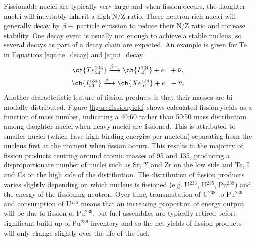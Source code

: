 Fissionable nuclei are typically very large and when fission occurs, the daughter nuclei will inevitably inherit a high N/Z ratio. These neutron-rich nuclei will generally decay by $\beta-$ particle emission to reduce their N/Z ratio and increase stability. One decay event is usually not enough to achieve a stable nucleus, so several decays as part of a decay chain are expected. An example is given for Te in Equations \ref{eqn:te_decay} and \ref{eqn:i_decay}.
\begin{gather}
\ch{Te^{134}_{52}} \xrightarrow[]{\beta-} \ch{I^{134}_{53}}+ e^{-} + \overline{\nu}_{e}
\label{eqn:te_decay} \\
\ch{I^{134}_{53}} \xrightarrow[]{\beta-} \ch{Xe^{134}_{54}} + e^{-} + \overline{\nu}_{e}
\label{eqn:i_decay}
\end{gather}
Another characteristic feature of fission products is that their masses are bi-modally distributed. Figure \ref{figure:fissionyield} shows calculated fission yields as a function of mass number, indicating a 40:60 rather than 50:50 mass distribution among daughter nuclei when heavy nuclei are fissioned. This is attributed to smaller nuclei (which have high binding energies per nucleon) separating from the nucleus first at the moment when fission occurs. This results in the majority of fission products centring around atomic masses of 95 and 135, producing a disproportionate number of nuclei such as Sr, Y and Zr on the low side and Te, I and Cs on the high side of the distribution. The distribution of fission products varies slightly depending on which nucleus is fissioned (e.g. U$^{233}$, U$^{235}$, Pu$^{239}$) and the energy of the fissioning neutron. Over time, transmutation of U$^{238}$ to Pu$^{239}$ and consumption of U$^{235}$ means that an increasing proportion of energy output will be due to fission of Pu$^{239}$, but fuel assemblies are typically retired before significant build-up of Pu$^{239}$ inventory and so the net yields of fission products will only change slightly over the life of the fuel.

